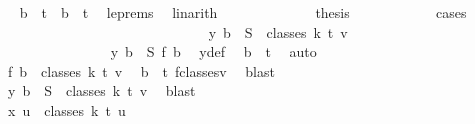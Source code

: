 \begin{isabellebody}
\ \isamarkupfalse%
\ {\isachardoublequoteopen}b\ {\isacharequal}{\kern0pt}\ t{\isachardoublequoteclose}\ {\isacharbar}{\kern0pt}\ {\isachardoublequoteopen}b\ {\isacharless}{\kern0pt}\ t{\isachardoublequoteclose}\ \isamarkupfalse%
\ le{\isachardot}{\kern0pt}prems{\isacharparenleft}{\kern0pt}{}{\isacharparenright}{\kern0pt}\ \isamarkupfalse%
\ linarith\isanewline
\ \ \ \ \ \ \ \ \ \ \isamarkupfalse%
\ \isamarkupfalse%
\ {\isacharquery}{\kern0pt}thesis\isanewline
\ \ \ \ \ \ \ \ \ \ \isamarkupfalse%
\ cases\isanewline
\ \ \ \ \ \ \ \ \ \ \ \ \isamarkupfalse%
\ {}\isanewline
\ \ \ \ \ \ \ \ \ \ \ \ \isamarkupfalse%
\ \isamarkupfalse%
\ {\isachardoublequoteopen}y\ b\ {\isasymin}\ S\ {\isacharbackquote}{\kern0pt}\ classes\ k\ t\ v{\isachardoublequoteclose}\ \isanewline
\ \ \ \ \ \ \ \ \ \ \ \ \isamarkupfalse%
\ {\isacharminus}{\kern0pt}\isanewline
\ \ \ \ \ \ \ \ \ \ \ \ \ \ \isamarkupfalse%
\ {\isachardoublequoteopen}y\ b\ {\isacharequal}{\kern0pt}\ S\ {\isacharparenleft}{\kern0pt}{\isacharquery}{\kern0pt}f\ b{\isacharparenright}{\kern0pt}{\isachardoublequoteclose}\ \isamarkupfalse%
\ y{\isacharunderscore}{\kern0pt}def\ \isamarkupfalse%
\ {\isacartoucheopen}b\ {\isacharequal}{\kern0pt}\ t{\isacartoucheclose}\ \isamarkupfalse%
\ auto\isanewline
\ \ \ \ \ \ \ \ \ \ \ \ \ \ \isamarkupfalse%
\ \isamarkupfalse%
\ {\isachardoublequoteopen}{\isacharquery}{\kern0pt}f\ b\ {\isasymin}\ classes\ k\ t\ v{\isachardoublequoteclose}\ \isamarkupfalse%
\ {\isacartoucheopen}b\ {\isacharequal}{\kern0pt}\ t{\isacartoucheclose}\ f{\isacharunderscore}{\kern0pt}classes{\isacharunderscore}{\kern0pt}v\ \isamarkupfalse%
\ blast\isanewline
\ \ \ \ \ \ \ \ \ \ \ \ \ \ \isamarkupfalse%
\ \isamarkupfalse%
\ {\isachardoublequoteopen}y\ b\ {\isasymin}\ S\ {\isacharbackquote}{\kern0pt}\ classes\ k\ t\ v{\isachardoublequoteclose}\ \isamarkupfalse%
\ blast\isanewline
\ \ \ \ \ \ \ \ \ \ \ \ \isamarkupfalse%
\isanewline
\ \ \ \ \ \ \ \ \ \ \ \ \isamarkupfalse%
\ \isamarkupfalse%
\ {\isachardoublequoteopen}x\ u\ {\isasymin}\ classes\ k\ t\ u{\isachardoublequoteclose}\isanewline
\ \ \ \ \ \ \ \ \ \ \ \ \isamarkupfalse%
\ {\isacharminus}{\kern0pt}\isanewline

\end{isabellebody}
